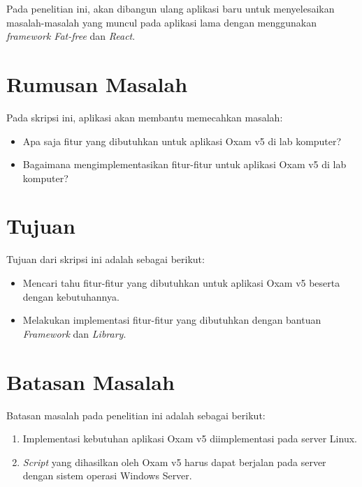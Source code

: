 Pada penelitian ini, akan dibangun ulang aplikasi baru untuk
menyelesaikan masalah-masalah yang muncul pada aplikasi lama dengan
menggunakan \textit{framework Fat-free} dan \textit{React}.

\section{Rumusan Masalah}
\label{sec:rumusan}
Pada skripsi ini, aplikasi akan membantu memecahkan masalah:
\begin{itemize}
    \item Apa saja fitur yang dibutuhkan untuk aplikasi Oxam v5 di lab komputer?
    
    \item Bagaimana mengimplementasikan fitur-fitur untuk aplikasi Oxam v5 di lab komputer?
\end{itemize}

\section{Tujuan}
\label{sec:tujuan}
Tujuan dari skripsi ini adalah sebagai berikut:
\begin{itemize}
    \item Mencari tahu fitur-fitur yang dibutuhkan untuk aplikasi Oxam v5 beserta dengan kebutuhannya.

    \item Melakukan implementasi fitur-fitur yang dibutuhkan dengan bantuan \textit{Framework} dan 
        \textit{Library}.

\end{itemize}

\section{Batasan Masalah}
\label{sec:batasan}
Batasan masalah pada penelitian ini adalah sebagai berikut:
\begin{enumerate}
    \item Implementasi kebutuhan aplikasi Oxam v5 diimplementasi pada server Linux.
    
    \item \textit{Script} yang dihasilkan oleh Oxam v5 harus 
        dapat berjalan pada server dengan sistem operasi Windows Server.
\end{enumerate}

